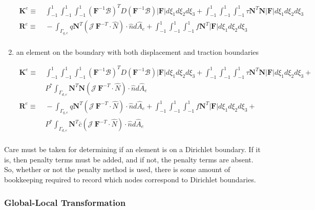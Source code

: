 \documentclass[10pt]{article}
\begin{document}
\begin{enumerate}
\begin{equation}
\begin{aligned}
\textbf{K}^e\equiv&\ \int_{-1}^{1}\int_{-1}^{1}\int_{-1}^{1}(\textbf{F}^{-1}\mathscr{B})^TD(\textbf{F}^{-1}\mathscr{B}) |\textbf{F}|d\xi_1d\xi_2d\xi_3+\int_{-1}^{1}\int_{-1}^{1}\int_{-1}^{1}\tau \textbf{N}^T\textbf{N} |\textbf{F}|d\xi_1d\xi_2d\xi_3\\
\textbf{R}^e\equiv&\ -\int_{\Gamma_{q,e}}q\textbf{N}^T(\mathscr{J}\ \textbf{F}^{-T}\cdot\hat{N})\cdot\hat{n}d\hat{A}_e+\int_{-1}^{1}\int_{-1}^{1}\int_{-1}^{1}f\textbf{N}^T|\textbf{F}|d\xi_1d\xi_2d\xi_3\\
\end{aligned}
\end{equation}

\item an element on the boundary with both displacement and traction boundaries

\begin{equation}
\begin{aligned}
\textbf{K}^e\equiv&\ \int_{-1}^{1}\int_{-1}^{1}\int_{-1}^{1}(\textbf{F}^{-1}\mathscr{B})^TD(\textbf{F}^{-1}\mathscr{B}) |\textbf{F}|d\xi_1d\xi_2d\xi_3+\int_{-1}^{1}\int_{-1}^{1}\int_{-1}^{1}\tau \textbf{N}^T\textbf{N} |\textbf{F}|d\xi_1d\xi_2d\xi_3+\quad\\
&\ P^{*}\int_{\Gamma_{d,e}}\textbf{N}^T\textbf{N} (\mathscr{J}\ \textbf{F}^{-T}\cdot\hat{N})\cdot\hat{n}d\hat{A}_e\\
\textbf{R}^e\equiv&\ -\int_{\Gamma_{q,e}}q\textbf{N}^T(\mathscr{J}\ \textbf{F}^{-T}\cdot\hat{N})\cdot\hat{n}d\hat{A}_e+\int_{-1}^{1}\int_{-1}^{1}\int_{-1}^{1}f\textbf{N}^T|\textbf{F}|d\xi_1d\xi_2d\xi_3+\quad\\
&\ P^{*}\int_{\Gamma_{d,e}}\textbf{N}^T\bar{c}(\mathscr{J}\ \textbf{F}^{-T}\cdot\hat{N})\cdot\hat{n}d\hat{A}_e\\
\end{aligned}
\end{equation}
\end{enumerate}

Care must be taken for determining if an element is on a Dirichlet boundary. If it is, then penalty terms must be added, and if not, the penalty terms are absent. So, whether or not the penalty method is used, there is some amount of bookkeeping required to record which nodes correspond to Dirichlet boundaries.

\subsubsection{Global-Local Transformation}
\label{sec:GlobalLocal}
\end{document}
